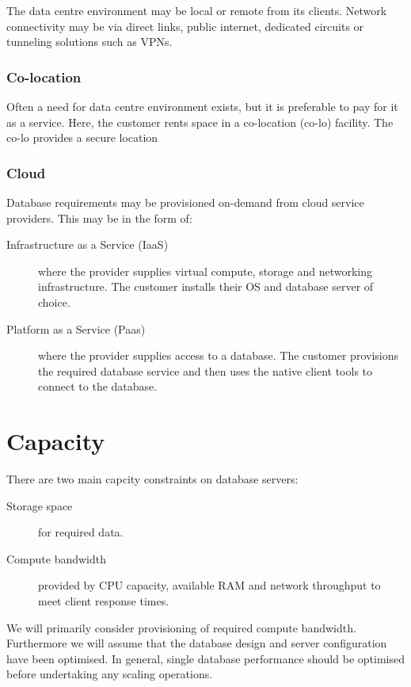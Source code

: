 \documentclass{pgnotes}
\begin{document}
The data centre environment may be local or remote from its clients.
Network connectivity may be via direct links, public internet, dedicated circuits or tunneling solutions such as VPNs. 


\subsubsection{Co-location}

Often a need for data centre environment exists, but it is preferable to pay for it as a service.
Here, the customer rents space in a co-location (co-lo) facility.
The co-lo provides a secure location 

\subsubsection{Cloud}

Database requirements may be provisioned on-demand from cloud service providers.
This may be in the form of:
\begin{description}
\item[Infrastructure as a Service (IaaS)] where the provider supplies virtual compute, storage and networking infrastructure.
  The customer installs their OS and database server of choice. 
\item[Platform as a Service (Paas)] where the provider supplies access to a database.
  The customer provisions the required database service and then uses the native client tools to connect to the database. 
\end{description}



\section{Capacity}

There are two main capcity constraints on database servers:
\begin{description}
\item[Storage space] for required data.
\item[Compute bandwidth] provided by CPU capacity, available RAM and network throughput to meet client response times.
\end{description}
We will primarily consider provisioning of required compute bandwidth.
Furthermore we will assume that the database design and server configuration have been optimised.
In general, single database performance should be optimised before undertaking any scaling operations. 
\end{document}
